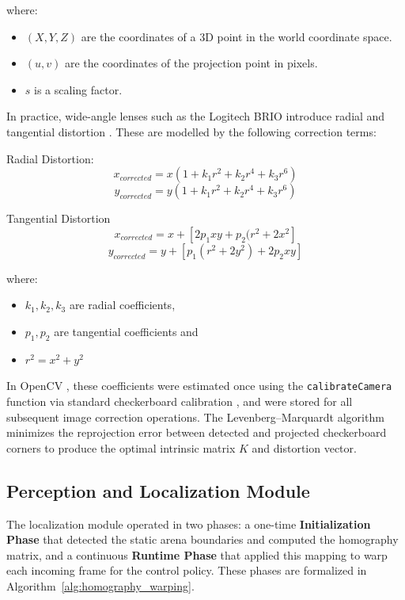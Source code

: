 \noindent where:
\begin{itemize}
    \item $(X, Y, Z)$ are the coordinates of a 3D point in the world coordinate space.
    \item $(u, v)$ are the coordinates of the projection point in pixels.
    \item $s$ is a scaling factor.
\end{itemize}

In practice, wide-angle lenses such as the Logitech BRIO introduce radial and tangential
distortion \cite{Brown1966DecenteringDistortion}. These are modelled by the following correction terms:

\noindent Radial Distortion:
\begin{equation}
    x_{corrected} = x(1 +k_1r^2 + k_2r^4 + k_3r^6)
    \label{radialDistortX}
\end{equation}
\begin{equation}
    y_{corrected} = y(1 +k_1r^2 + k_2r^4 + k_3r^6)
    \label{radialDistortY}
\end{equation}

\noindent Tangential Distortion
\begin{equation}
    x_{corrected} = x + [2p_1xy + p_2(r^2 + 2x^2]
\end{equation}
\begin{equation}
    y_{corrected} = y + [p_1(r^2 + 2y^2) + 2p_2xy]
\end{equation}

\noindent where:
\begin{itemize}
    \item \(k_1, k_2, k_3\) are radial coefficients,
    \item \(p_1, p_2\) are tangential coefficients and
    \item \(r^2 = x^2 + y^2\)
\end{itemize}

In OpenCV \cite{Bradski2000OpenCV}, these coefficients were estimated once using the
\texttt{calibrateCamera} function via standard checkerboard calibration
\cite{Zhang2000CameraCalibration}, and were stored for all subsequent image correction
operations. The Levenberg--Marquardt algorithm \cite{Levenberg1944LeastSquares}
minimizes the reprojection error between detected and projected checkerboard corners
to produce the optimal intrinsic matrix $K$ and distortion vector.

\subsection{Perception and Localization Module}
The localization module operated in two phases: a one-time \textbf{Initialization Phase}
that detected the static arena boundaries and computed the homography matrix, and a
continuous \textbf{Runtime Phase} that applied this mapping to warp each incoming frame
for the control policy. These phases are formalized in Algorithm~\ref{alg:homography_warping}.

